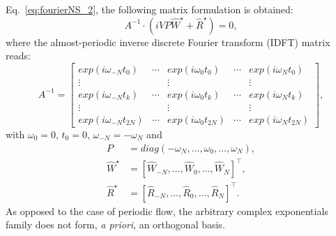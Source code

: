 Eq.~\eqref{eq:fourierNS_2}, the following matrix formulation is
obtained:
\begin{equation}
   A^{-1} \cdot \left(i V P\widehat{W}^{\star} + \widehat{R}^{\star} \right) = 0,
   \label{eq:matrixFourierNS}
\end{equation}
where the almost-periodic inverse discrete Fourier transform (IDFT)
matrix reads:
\begin{equation}
   A^{-1} = 
   \begin{bmatrix}
      exp(i\omega_{-N}t_{0})  & \cdots & exp(i\omega_{0}t_{0})    & \cdots  & exp(i\omega_{N}t_{0}) \\
      \vdots                  &       & \vdots                  &       & \vdots                \\
      exp(i\omega_{-N}t_{k})  & \cdots & exp(i\omega_{0}t_{k})    & \cdots  & exp(i\omega_{N}t_{k}) \\
      \vdots                  &       & \vdots                  &       & \vdots                \\
      exp(i\omega_{-N}t_{2N}) & \cdots & exp(i\omega_{0}t_{2N}) & \cdots  & exp(i\omega_{N}t_{2N})
      \end{bmatrix},
   \label{MatriceA}
\end{equation}
with $\omega_0=0$, $t_0=0$, $\omega_{-N} = -\omega_{N}$ and
\begin{equation}
  \begin{split}
   P &= diag\left(-\omega_N,\ldots,\omega_0,\ldots,\omega_N \right),\\
   \widehat{W}^{\star} & = \left[\widehat{W}_{-N},\ldots,\widehat{W}_0,\ldots,\widehat{W}_N \right]^\top,\\
   \widehat{R}^{\star} & = \left[\widehat{R}_{-N},\ldots,\widehat{R}_0,\ldots,\widehat{R}_N \right]^\top.
  \end{split}
\end{equation}
As opposed to the case of periodic flow, the arbitrary complex
exponentials family does not form, \emph{a priori}, an orthogonal
basis. %

